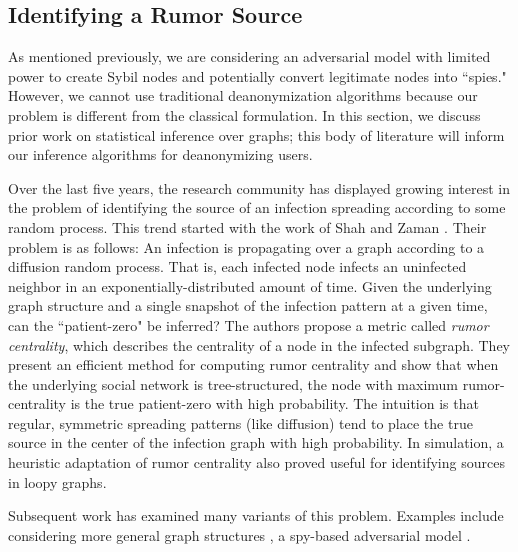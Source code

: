 \documentclass[10pt, twocolumn]{article}
\begin{document}
\subsection{Identifying a Rumor Source}
As mentioned previously, we are considering an adversarial model with limited power to create Sybil nodes and potentially convert legitimate nodes into ``spies."
However, we cannot use traditional deanonymization algorithms because our problem is different from the classical formulation. 
In this section, we discuss prior work on statistical inference over graphs; this body of literature will inform our inference algorithms for deanonymizing users.

Over the last five years, the research community has displayed growing interest in the problem of identifying the source of an infection spreading according to some random process. 
This trend started with the work of Shah and Zaman \cite{shah2011rumors}. Their problem is as follows: An infection is propagating over a graph according to a diffusion random process. That is, each infected node infects an uninfected neighbor in an exponentially-distributed amount of time. Given the underlying graph structure and a single snapshot of the infection pattern at a given time, can the ``patient-zero" be inferred? The authors propose a metric called \emph{rumor centrality}, which describes the centrality of a node in the infected subgraph. They present an efficient method for computing rumor centrality and show that when the underlying social network is tree-structured, the node with maximum rumor-centrality is the true patient-zero with high probability. The intuition is that regular, symmetric spreading patterns (like diffusion) tend to place the true source in the center of the infection graph with high probability. 
In simulation, a heuristic adaptation of rumor centrality also proved useful for identifying sources in loopy graphs.

Subsequent work has examined many variants of this problem. Examples include considering more general graph structures \cite{shah2012rumor}, a spy-based adversarial model \cite{pinto2012locating,luo2013identify}.




\end{document}
